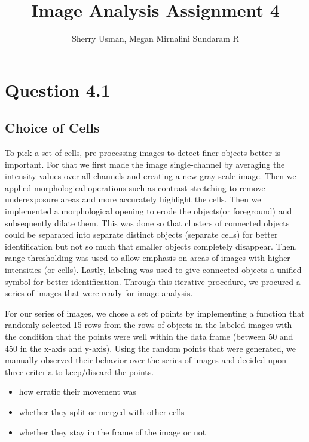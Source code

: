 \documentclass{article}
\title{Image Analysis Assignment 4}
\author{Sherry Usman, Megan Mirnalini Sundaram R}
\begin{document}
\maketitle

\section*{Question 4.1}
\subsection*{Choice of Cells}
\par To pick a set of cells, pre-processing images to detect finer objects better is important. For that we first made the image single-channel by averaging the intensity values over all channels and creating a new gray-scale image. Then we applied morphological operations such as contrast stretching to remove underexposure areas and more accurately highlight the cells. Then we implemented a morphological opening to erode the objects(or foreground) and subsequently dilate them. This was done so that clusters of connected objects could be separated into separate distinct objects (separate cells) for better identification but not so much that smaller objects completely disappear. Then, range thresholding was used to allow emphasis on areas of images with higher intensities (or cells). Lastly, labeling was used to give connected objects a unified symbol for better identification. Through this iterative procedure, we procured a series of images that were ready for image analysis.\newline 

\par For our series of images, we chose a set of points by implementing a function that randomly selected 15 rows from the rows of objects in the labeled images with the condition that the points were well within the data frame (between 50 and 450 in the x-axis and y-axis). Using the random points that were generated, we manually observed their behavior over the series of images and decided upon three criteria to keep/discard the points. 
\begin{itemize}
    \item how erratic their movement was
    \item whether they split or merged with other cells
    \item whether they stay in the frame of the image or not
\end{itemize}
\end{document}
